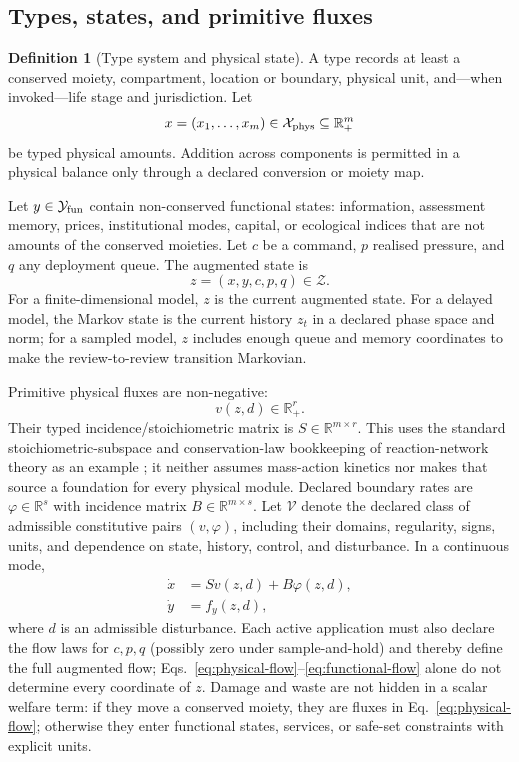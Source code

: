 \documentclass[11pt]{article}
\theoremstyle{definition}
\newtheorem{definition}{Definition}
\newcommand{\R}{\mathbb R}
\newcommand{\Rp}{\mathbb R_+}
\begin{document}
\subsection{Types, states, and primitive fluxes}

\begin{definition}[Type system and physical state]
A type records at least a conserved moiety, compartment, location or boundary, physical unit, and---when invoked---life stage and jurisdiction. Let
\[
x=(x_1,\ldots,x_m)\in\mathcal X_{\rm phys}\subseteq\Rp^m
\]
be typed physical amounts. Addition across components is permitted in a physical balance only through a declared conversion or moiety map.
\end{definition}

Let $y\in\mathcal Y_{\rm fun}$ contain non-conserved functional states: information, assessment memory, prices, institutional modes, capital, or ecological indices that are not amounts of the conserved moieties. Let $c$ be a command, $p$ realised pressure, and $q$ any deployment queue. The augmented state is
\[
z=(x,y,c,p,q)\in\mathcal Z.
\]
For a finite-dimensional model, $z$ is the current augmented state. For a delayed model, the Markov state is the current history $z_t$ in a declared phase space and norm; for a sampled model, $z$ includes enough queue and memory coordinates to make the review-to-review transition Markovian.

Primitive physical fluxes are non-negative:
\[
v(z,d)\in\Rp^r.
\]
Their typed incidence/stoichiometric matrix is $S\in\R^{m\times r}$. This uses the standard stoichiometric-subspace and conservation-law bookkeeping of reaction-network theory as an example \cite{feinberg2019}; it neither assumes mass-action kinetics nor makes that source a foundation for every physical module. Declared boundary rates are $\varphi\in\R^s$ with incidence matrix $B\in\R^{m\times s}$. Let $\mathcal V$ denote the declared class of admissible constitutive pairs $(v,\varphi)$, including their domains, regularity, signs, units, and dependence on state, history, control, and disturbance. In a continuous mode,
\begin{align}
\dot x&=Sv(z,d)+B\varphi(z,d), \label{eq:physical-flow}\\
\dot y&=f_y(z,d), \label{eq:functional-flow}
\end{align}
where $d$ is an admissible disturbance. Each active application must also declare the flow laws for $c,p,q$ (possibly zero under sample-and-hold) and thereby define the full augmented flow; Eqs.~\eqref{eq:physical-flow}--\eqref{eq:functional-flow} alone do not determine every coordinate of $z$. Damage and waste are not hidden in a scalar welfare term: if they move a conserved moiety, they are fluxes in Eq.~\eqref{eq:physical-flow}; otherwise they enter functional states, services, or safe-set constraints with explicit units.
\end{document}
